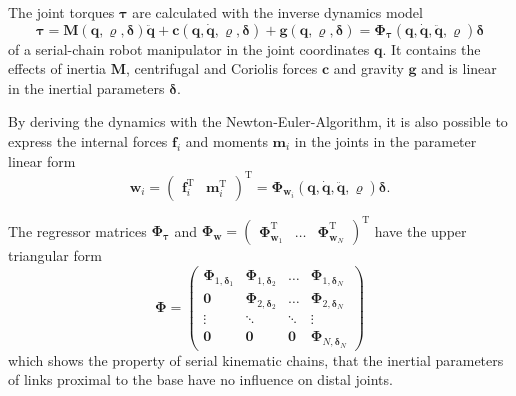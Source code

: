 \documentclass{svproc}
\newcommand{\bm}[1]{\boldsymbol{#1}}
\newcommand{\transp}[0]{{\mathrm{T}}}
\begin{document}
The joint torques $\bm{\tau}$ are calculated with the inverse dynamics model
%
\begin{equation}
\bm{\tau} = 
\bm{M}(\bm{q},\bm{\varrho},\bm{\delta}) \ddot{\bm{q}}
+ \bm{c}(\bm{q},\dot{\bm{q}},\bm{\varrho},\bm{\delta})
+ \bm{g}(\bm{q},\bm{\varrho},\bm{\delta})
=
\bm{\Phi}_{\bm{\tau}}(\bm{q},\dot{\bm{q}},\ddot{\bm{q}},\bm{\varrho}) \bm{\delta}
\label{equ:invdyn}
\end{equation}
%
of a serial-chain robot manipulator in the joint coordinates $\bm{q}$.
It contains the effects of inertia $\bm{M}$, centrifugal and Coriolis forces $\bm{c}$ and gravity $\bm{g}$ and is linear in the inertial parameters $\bm{\delta}$.

By deriving the dynamics with the Newton-Euler-Algorithm, it is also possible to express the internal forces $\bm{f}_i$ and moments $\bm{m}_i$ in the joints in the parameter linear form
\begin{equation}
\bm{w}_i = 
\begin{pmatrix} \bm{f}_i^\transp & \bm{m}_i^\transp\end{pmatrix}^\transp
=
\bm{\Phi}_{\bm{w}_i}(\bm{q},\dot{\bm{q}},\ddot{\bm{q}},\bm{\varrho}) \bm{\delta}.
\label{equ:joint_wrench}
\end{equation}

The regressor matrices $\bm{\Phi}_{\bm{\tau}}$ and
$%
\bm{\Phi}_{\bm{w}}=\begin{pmatrix} \bm{\Phi}_{\bm{w}_1}^\transp & \dots & \bm{\Phi}_{\bm{w}_N}^\transp\end{pmatrix}^\transp
$%
have the upper triangular form
\begin{equation}
\bm{\Phi}=
\begin{pmatrix} \bm{\Phi}_{1,\bm{\delta}_1} & \bm{\Phi}_{1,\bm{\delta}_2} & \dots & \bm{\Phi}_{1,\bm{\delta}_N} \\
\bm{0} & \bm{\Phi}_{2,\bm{\delta}_2} & \dots & \bm{\Phi}_{2,\bm{\delta}_N} \\
\vdots & \ddots & \ddots & \vdots \\
\bm{0} & \bm{0} & \bm{0} & \bm{\Phi}_{N,\bm{\delta}_N}
\end{pmatrix}
\label{equ:regressor_triangular}
\end{equation}
%
which shows the property of serial kinematic chains, that the inertial parameters of links proximal to the base have no influence on distal joints.
\end{document}
